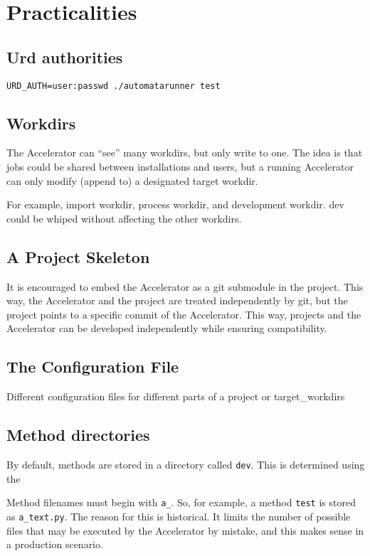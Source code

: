 \documentclass[a4paper]{article}
\begin{document}
\clearpage
\appendix

\section{Practicalities}

\subsection{Urd authorities}
\begin{verbatim}
URD_AUTH=user:passwd ./automatarunner test
\end{verbatim}

\subsection{Workdirs}
The Accelerator can ``see'' many workdirs, but only write to one.  The
idea is that jobs could be shared between installations and users, but
a running Accelerator can only modify (append to) a designated target
workdir.

For example, import workdir, process workdir, and development workdir.
dev could be whiped without affecting the other workdirs.


\subsection{A Project Skeleton}
It is encouraged to embed the Accelerator as a git submodule in the
project.  This way, the Accelerator and the project are treated
independently by git, but the project points to a specific commit of
the Accelerator.  This way, projects and the Accelerator can be
developed independently while ensuring compatibility.

\subsection{The Configuration File}

Different configuration files for different parts of a project or target\_workdirs


\subsection{Method directories}
By default, methods are stored in a directory called \texttt{dev}.
This is determined using the 

Method filenames must begin with \texttt{a\_}.  So, for example, a
method \texttt{test} is stored as \texttt{a\_text.py}.  The reason for
this is historical.  It limits the number of possible files that may
be executed by the Accelerator by mistake, and this makes sense in a
production scenario.
\end{document}
